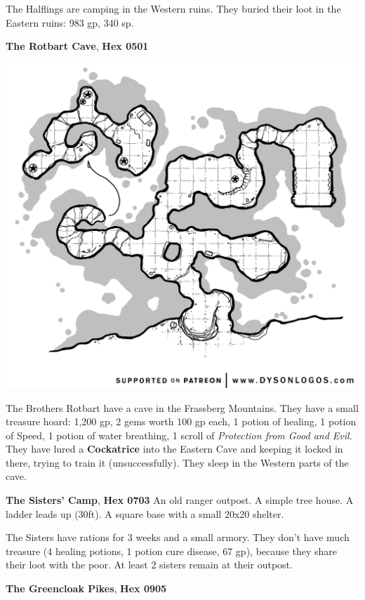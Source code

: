 \documentclass[
]{book}
\begin{document}
The Halflings are camping in the Western ruins. They buried their loot in the Eastern ruins: 983 gp, 340 sp.

\textbf{The Rotbart Cave}, \textbf{Hex 0501}

\begin{center}\includegraphics[width=1\linewidth]{graphics/blind-lamias-cave} \end{center}

The Brothers Rotbart have a cave in the Frassberg Mountains. They have a small treasure hoard: 1,200 gp, 2 gems worth 100 gp each, 1 potion of healing, 1 potion of Speed, 1 potion of water breathing, 1 scroll of \emph{Protection from Good and Evil}. They have lured a \textbf{Cockatrice} into the Eastern Cave and keeping it locked in there, trying to train it (unsuccessfully). They sleep in the Western parts of the cave.

\textbf{The Sisters' Camp}, \textbf{Hex 0703}
An old ranger outpost. A simple tree house. A ladder leads up (30ft). A square base with a small 20x20 shelter.

The Sisters have rations for 3 weeks and a small armory. They don't have much treasure (4 healing potions, 1 potion cure disease, 67 gp), because they share their loot with the poor. At least 2 sisters remain at their outpost.

\textbf{The Greencloak Pikes}, \textbf{Hex 0905}
\end{document}
